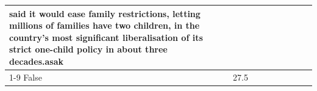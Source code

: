 \begin{table}[H]
\begin{tabular}{lllrlllll}
said it would ease family restrictions, letting millions of families have two children, in the country's most significant liberalisation of its strict one-child policy in about three decades.asak \\
\cline{1-9}
False & 27.5%
\end{tabular}
\end{table}
